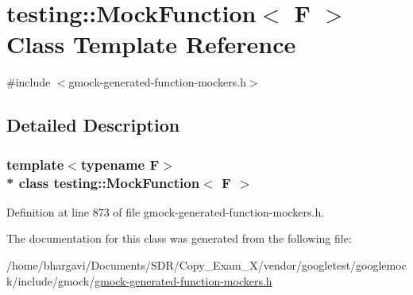 \hypertarget{classtesting_1_1_mock_function}{}\section{testing\+:\+:Mock\+Function$<$ F $>$ Class Template Reference}
\label{classtesting_1_1_mock_function}


{\ttfamily \#include $<$gmock-\/generated-\/function-\/mockers.\+h$>$}



\subsection{Detailed Description}
\subsubsection*{template$<$typename F$>$\\*
class testing\+::\+Mock\+Function$<$ F $>$}



Definition at line 873 of file gmock-\/generated-\/function-\/mockers.\+h.



The documentation for this class was generated from the following file\+:\begin{DoxyCompactItemize}
\item 
/home/bhargavi/\+Documents/\+S\+D\+R/\+Copy\+\_\+\+Exam\+\_\+X/vendor/googletest/googlemock/include/gmock/\hyperlink{gmock-generated-function-mockers_8h}{gmock-\/generated-\/function-\/mockers.\+h}\end{DoxyCompactItemize}
